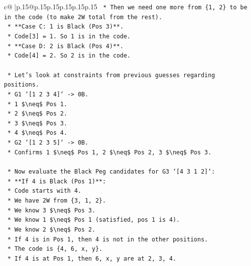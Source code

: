 \documentclass{article}
\begin{document}
{\begin{supertabular}{c@{$\;$}|p{.15\linewidth}@{}p{.15\linewidth}p{.15\linewidth}p{.15\linewidth}p{.15\linewidth}p{.15\linewidth}}
{{{\texttt{                *   Then we need one more from \{1, 2\} to be in the code (to make 2W total from the rest).} \\
\texttt{            *   **Case C: 1 is Black (Pos 3)**.} \\
\texttt{                *   Code{[}3{]} = 1. So 1 is in the code.} \\
\texttt{            *   **Case D: 2 is Black (Pos 4)**.} \\
\texttt{                *   Code{[}4{]} = 2. So 2 is in the code.} \\
\\ 
\texttt{    *   Let's look at constraints from previous guesses regarding positions.} \\
\texttt{        *   G1 `{[}1 2 3 4{]}` {-}> 0B.} \\
\texttt{            *   1 \$\textbackslash{}neq\$ Pos 1.} \\
\texttt{            *   2 \$\textbackslash{}neq\$ Pos 2.} \\
\texttt{            *   3 \$\textbackslash{}neq\$ Pos 3.} \\
\texttt{            *   4 \$\textbackslash{}neq\$ Pos 4.} \\
\texttt{        *   G2 `{[}1 2 3 5{]}` {-}> 0B.} \\
\texttt{            *   Confirms 1 \$\textbackslash{}neq\$ Pos 1, 2 \$\textbackslash{}neq\$ Pos 2, 3 \$\textbackslash{}neq\$ Pos 3.} \\
\\ 
\texttt{    *   Now evaluate the Black Peg candidates for G3 `{[}4 3 1 2{]}`:} \\
\texttt{        *   **If 4 is Black (Pos 1)**:} \\
\texttt{            *   Code starts with 4.} \\
\texttt{            *   We have 2W from \{3, 1, 2\}.} \\
\texttt{            *   We know 3 \$\textbackslash{}neq\$ Pos 3.} \\
\texttt{            *   We know 1 \$\textbackslash{}neq\$ Pos 1 (satisfied, pos 1 is 4).} \\
\texttt{            *   We know 2 \$\textbackslash{}neq\$ Pos 2.} \\
\texttt{            *   If 4 is in Pos 1, then 4 is not in the other positions.} \\
\texttt{            *   The code is \{4, 6, x, y\}.} \\
\texttt{            *   If 4 is at Pos 1, then 6, x, y are at 2, 3, 4.} \\
}}}
\end{supertabular}}
\end{document}
